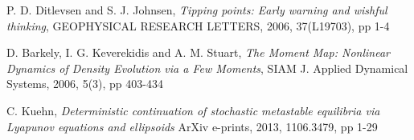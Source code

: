 \documentclass[11pt]{article}
\begin{document}
\begin{thebibliography}{10}
{\sc P. D. Ditlevsen and S. J. Johnsen},
{\it Tipping points: Early warning and wishful thinking},
GEOPHYSICAL RESEARCH LETTERS, 2006, 37(L19703), pp 1-4

{\sc D. Barkely, I. G. Keverekidis and A. M. Stuart},
{\it The Moment Map: Nonlinear Dynamics of Density Evolution via a Few Moments},
SIAM J. Applied Dynamical Systems, 2006, 5(3), pp 403-434

{\sc C. Kuehn},
{\it Deterministic continuation of stochastic metastable equilibria via Lyapunov equations and ellipsoids}
ArXiv e-prints, 2013, 1106.3479, pp 1-29




\end{thebibliography} 
\end{document}
